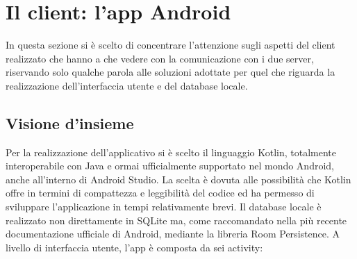 \documentclass[12pt]{article}
\begin{document}
\section{Il client: l'app Android}
In questa sezione si è scelto di concentrare l'attenzione sugli aspetti del client realizzato che hanno a che vedere con la comunicazione con i due server, riservando solo qualche parola alle soluzioni adottate per quel che riguarda la realizzazione dell'interfaccia utente e del database locale.
	\subsection{Visione d'insieme}
	Per la realizzazione dell'applicativo si è scelto il linguaggio Kotlin, totalmente interoperabile con Java e ormai ufficialmente supportato nel mondo Android, anche all'interno di Android Studio. La scelta è dovuta alle possibilità che Kotlin offre in termini di compattezza e leggibilità del codice ed ha permesso di sviluppare l'applicazione in tempi relativamente brevi.\newline
	Il database locale è realizzato non direttamente in SQLite ma, come raccomandato nella più recente documentazione ufficiale di Android, mediante la libreria Room Persistence.
	A livello di interfaccia utente, l'app è composta da sei activity:
\end{document}
